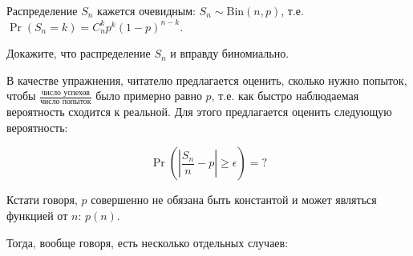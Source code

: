 Распределение $S_n$ кажется очевидным: $S_n \sim \mathrm{Bin}(n, p)$, т.е. $\Pr(S_n = k) = C_n^kp^k(1-p)^{n-k}$.

\begin{exercise}
    Докажите, что распределение $S_n$ и вправду биномиально.
\end{exercise}

\begin{exercise}
    В качестве упражнения, читателю предлагается оценить, сколько нужно попыток, чтобы $\frac{\text{число успехов}}{\text{число попыток}}$ было примерно равно $p$, т.е. как быстро наблюдаемая вероятность сходится к реальной. Для этого предлагается оценить следующую вероятность:
\end{exercise}
\[
    \Pr\left(\left|\frac{S_n}{n}-p\right|\geq \epsilon\right) = ?
\]

Кстати говоря, $p$ совершенно не обязана быть константой и может являться функцией от $n$: $p(n)$.

Тогда, вообще говоря, есть несколько отдельных случаев:

